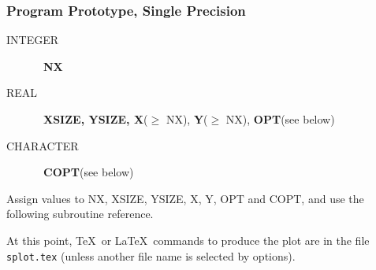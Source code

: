 \documentclass[twoside]{MATH77}
\begin{document}
\subsubsection{Program Prototype, Single Precision\label{PPSP}}
\begin{description}
\item[INTEGER] \ {\bf NX}
\item[REAL]    \ {\bf XSIZE, YSIZE, X}($\geq$ NX), {\bf Y}($\geq$ NX),
                      {\bf OPT}(see below)
\item[CHARACTER] \ {\bf COPT}(see below)
\end{description}
Assign values to NX, XSIZE, YSIZE, X, Y, OPT and COPT, and use the following
subroutine reference.
\begin{center}
\end{center}
At this point, \TeX\ or \LaTeX\ commands to produce the plot are in the file
{\tt splot.tex} (unless another file name is selected by options).
\end{document}

